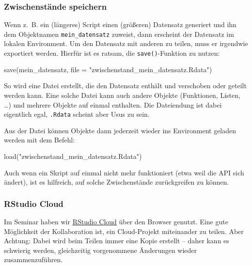 \documentclass[
  ngerman,
]{article}
\newenvironment{Shaded}{\begin{snugshade}}{\end{snugshade}}
\newcommand{\AttributeTok}[1]{\textcolor[rgb]{0.77,0.63,0.00}{#1}}
\newcommand{\FunctionTok}[1]{\textcolor[rgb]{0.00,0.00,0.00}{#1}}
\newcommand{\NormalTok}[1]{#1}
\newcommand{\StringTok}[1]{\textcolor[rgb]{0.31,0.60,0.02}{#1}}
\begin{document}
\hypertarget{zwischenstuxe4nde-speichern}{%
\subsubsection{Zwischenstände speichern}\label{zwischenstuxe4nde-speichern}}

Wenn z.~B. ein (längeres) Script einen (größeren) Datensatz generiert und ihn dem Objektnamen \texttt{mein\_datensatz} zuweist, dann erscheint der Datensatz im lokalen Environment. Um den Datensatz mit anderen zu teilen, muss er irgendwie exportiert werden. Hierfür ist es ratsam, die \texttt{save()}-Funktion zu nutzen:

\begin{Shaded}
\begin{Highlighting}[]
\FunctionTok{save}\NormalTok{(mein\_datensatz, }\AttributeTok{file =} \StringTok{"zwischenstand\_mein\_datensatz.Rdata"}\NormalTok{)}
\end{Highlighting}
\end{Shaded}

So wird eine Datei erstellt, die den Datensatz enthält und verschoben oder geteilt werden kann. Eine solche Datei kann auch andere Objekte (Funktionen, Listen, \ldots) und mehrere Objekte auf einmal enthalten. Die Dateiendung ist dabei eigentlich egal, \texttt{.Rdata} scheint aber Usus zu sein.

Aus der Datei können Objekte dann jederzeit wieder ins Environment geladen werden mit dem Befehl:

\begin{Shaded}
\begin{Highlighting}[]
\FunctionTok{load}\NormalTok{(}\StringTok{"zwischenstand\_mein\_datensatz.Rdata"}\NormalTok{)}
\end{Highlighting}
\end{Shaded}

Auch wenn ein Skript auf einmal nicht mehr funktioniert (etwa weil die API sich ändert), ist es hilfreich, auf solche Zwischenstände zurückgreifen zu können.

\hypertarget{rstudio-cloud}{%
\subsubsection{RStudio Cloud}\label{rstudio-cloud}}

Im Seminar haben wir \href{https://rstudio.cloud/}{RStudio Cloud} über den Browser genutzt. Eine gute Möglichkeit der Kollaboration ist, ein Cloud-Projekt miteinander zu teilen. Aber Achtung: Dabei wird beim Teilen immer eine Kopie erstellt -- daher kann es schwierig werden, gleichzeitig vorgenommene Änderungen wieder zusammenzuführen.
\end{document}
